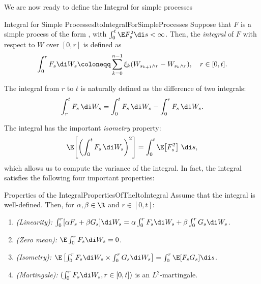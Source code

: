 We are now ready to define the \Ito{} Integral for simple processes

\begin{defn}{\Ito{} Integral for Simple Processes}{ItoIntegralForSimpleProcesses}
	Suppose that $F$ is a simple process of the form , with $\int_0^t \E F_s^2 \di s < \infty$. Then, the \emph{\Ito{} integral} of $F$ with respect to $W$ over $[0, r]$ is defined as
	\begin{equation}\label{eq:ItoIntegralSimpleDef}
		\int_0^r F_s \di W_s \coloneqq \sum_{k=0}^{n-1} \xi_k (W_{s_{k+1} \wedge r} - W_{s_k \wedge r}), \quad r \in [0, t].
	\end{equation}
\end{defn}

The \Ito{} integral from $r$ to $t$ is naturally defined as the difference of two integrals:
\begin{equation}
	\int_{r}^{t} F_{s} \, \di W_{s}
	= \int_{0}^{t} F_{s} \, \di W_{s} - \int_{0}^{r} F_{s} \, \di W_{s}.
\end{equation}

The \Ito{} integral has the important \textit{isometry} property:
\begin{equation}
	\E\!\left[ \left( \int_{0}^{t} F_{s} \, \di W_{s} \right)^{2} \right]
	= \int_{0}^{t} \E\!\left[ F_{s}^{2} \right] \, \di s,
\end{equation}
which allows us to compute the variance of the \Ito{} integral. In fact, the \Ito{} integral satisfies the following four important properties:

\begin{thm}{Properties of the \Ito{} Integral}{PropertiesOfTheItoIntegral}
	Assume that the \Ito{} integral is well-defined. Then, for $\alpha, \beta \in \R$ and $r \in [0, t]$:
	\begin{enumerate}
		\item \emph{(Linearity):} $\int_0^r [\alpha F_s + \beta G_s] \di W_s = \alpha \int_0^r F_s \di W_s + \beta \int_0^r G_s \di W_s$.
		\item \emph{(Zero mean):} $\E \int_0^r F_s \di W_s = 0$.
		\item \emph{(Isometry):} $\E \left[ \int_0^r F_s \di W_s \times \int_0^r G_s \di W_s \right] = \int_0^r \E [F_s G_s] \di s$.
		\item \emph{(Martingale):} $(\int_0^r F_s \di W_s, r \in [0, t])$ is an $L^2$-martingale.
	\end{enumerate}
\end{thm}

